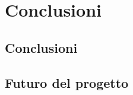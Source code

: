 \chapter{Conclusioni}\label{cap:conclusioni}
\section{Conclusioni}\label{sez:conclusioni}
\section{Futuro del progetto}\label{sez:futuro}